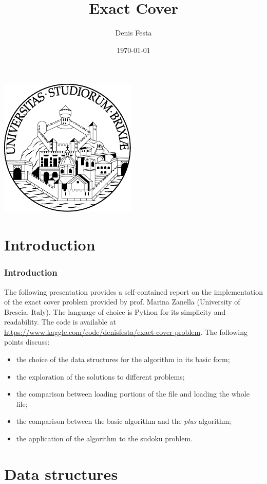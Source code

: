 \documentclass{beamer}
\title{Exact Cover}
\author{Denis Festa}
\date{\today}
\begin{document}
\begin{frame}
    \titlepage
    \centering
    \includegraphics[width=0.2\linewidth]{unibs-circ-logo.pdf}
\end{frame}


\section{Introduction}
\begin{frame}
    \frametitle{Introduction}

    The following presentation provides a self-contained report on the 
    implementation of the exact cover problem provided by prof. Marina Zanella
    (University of Brescia, Italy).
    The language of choice is Python for its simplicity and readability.
    The code is available at \url{https://www.kaggle.com/code/denisfesta/exact-cover-problem}.
    The following points discuss:
    \begin{itemize}
        \item the choice of the data structures for the algorithm in its basic form;
        \item the exploration of the solutions to different problems;
        \item the comparison between loading portions of the file and loading the 
            whole file;
        \item the comparison between the basic algorithm and the \textit{plus} 
            algorithm;
        \item the application of the algorithm to the sudoku problem.
    \end{itemize}

\end{frame}

\section*{Data structures}
\end{document}
